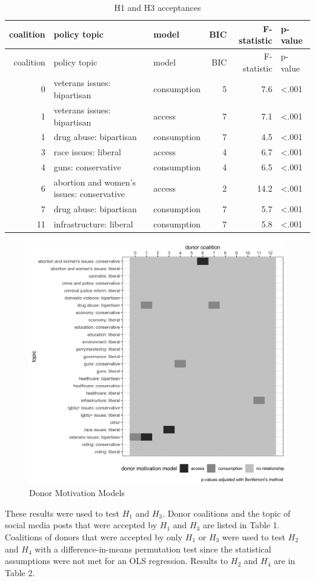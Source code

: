 \documentclass[12pt,]{article}
\begin{document}
\begin{longtable}[]{@{}rllrrl@{}}
\caption{H1 and H3 acceptances}\tabularnewline
\toprule
coalition & policy topic & model & BIC & F-statistic &
p-value\tabularnewline
\midrule
\endfirsthead
\toprule
coalition & policy topic & model & BIC & F-statistic &
p-value\tabularnewline
\midrule
\endhead
0 & veterans issues: bipartisan & consumption & 5 & 7.6 &
\textless.001\tabularnewline
1 & veterans issues: bipartisan & access & 7 & 7.1 &
\textless.001\tabularnewline
1 & drug abuse: bipartisan & consumption & 7 & 4.5 &
\textless.001\tabularnewline
3 & race issues: liberal & access & 4 & 6.7 &
\textless.001\tabularnewline
4 & guns: conservative & consumption & 4 & 6.5 &
\textless.001\tabularnewline
6 & abortion and women's issues: conservative & access & 2 & 14.2 &
\textless.001\tabularnewline
7 & drug abuse: bipartisan & consumption & 7 & 5.7 &
\textless.001\tabularnewline
11 & infrastructure: liberal & consumption & 7 & 5.8 &
\textless.001\tabularnewline
\bottomrule
\end{longtable}

\begin{figure}
\centering
\includegraphics{../tables_and_figures/fig_2.jpg}
\caption{Donor Motivation Models}
\end{figure}

These results were used to test \(H_{1}\) and \(H_{3}\). Donor
coalitions and the topic of social media posts that were accepted by
\(H_{1}\) and \(H_{3}\) are listed in Table 1. Coalitions of donors that
were accepted by only \(H_{1}\) or \(H_{3}\) were used to test \(H_{2}\)
and \(H_{4}\) with a difference-in-means permutation test since the
statistical assumptions were not met for an OLS regression. Results to
\(H_{2}\) and \(H_{4}\) are in Table 2.
\end{document}
